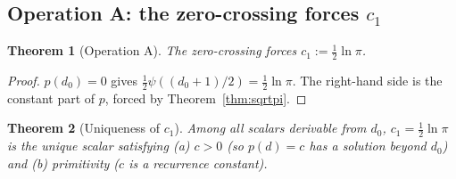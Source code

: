 \documentclass[11pt,a4paper]{article}
\newtheorem{theorem}{Theorem}[section]
\begin{document}
\subsection{Operation A: the zero-crossing forces \texorpdfstring{$c_1$}{c\_1}}

\begin{theorem}[Operation A]\label{thm:opA}
The zero-crossing forces $c_1 := \tfrac{1}{2}\ln\pi$.
\end{theorem}

\begin{proof}
$p(d_0) = 0$ gives $\frac{1}{2}\psi((d_0+1)/2) = \frac{1}{2}\ln\pi$.
The right-hand side is the constant part of $p$, forced by
Theorem~\ref{thm:sqrtpi}.
\end{proof}

\begin{theorem}[Uniqueness of $c_1$]\label{thm:c1unique}
Among all scalars derivable from $d_0$, $c_1 = \tfrac{1}{2}\ln\pi$ is the
unique scalar satisfying (a) $c > 0$ (so $p(d) = c$ has a solution beyond
$d_0$) and (b) primitivity ($c$ is a recurrence constant).
\end{theorem}
\end{document}
